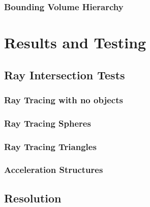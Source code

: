 \documentclass[final]{cmpreport}
\begin{document}
\subsubsection{Bounding Volume Hierarchy}

\section{Results and Testing}

\subsection{Ray Intersection Tests}

\subsubsection{Ray Tracing with no objects}

\subsubsection{Ray Tracing Spheres}

\subsubsection{Ray Tracing Triangles}

\subsubsection{Acceleration Structures}

\subsection{Resolution}
\end{document}
